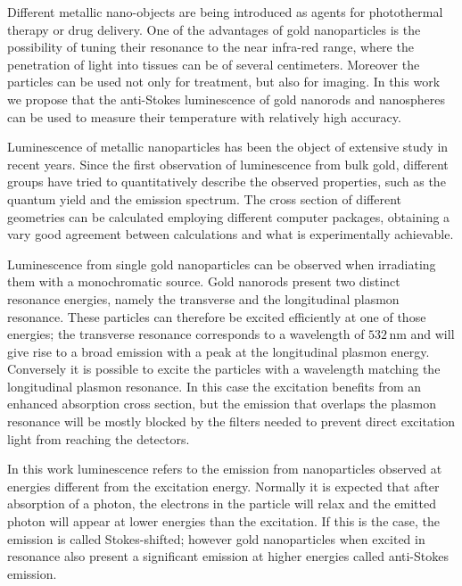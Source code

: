 \documentclass[journal=nalefd,manuscript=letter]{achemso}
\newcommand{\nm}{\ensuremath{\,\textrm{nm}}}
\begin{document}
Different metallic nano-objects are being introduced as agents for photothermal
therapy or drug delivery\cite{Kang2013,Huang2006,Huang2008}. One of the
advantages of gold nanoparticles is the possibility of tuning their resonance to
the near infra-red range, where the penetration of light into tissues can be of
several
centimeters\cite{Huang2006,Gobin2007,Hirsch2003,ONeal2004,Li2013c,Huang2008}.
Moreover the particles can be used not only for treatment, but also for
imaging\cite{Zhao2014a,Huang2006}. In this work we propose that the anti-Stokes
luminescence of gold nanorods and nanospheres can be used to measure their
temperature with relatively high accuracy.

Luminescence of metallic nanoparticles has been the object of extensive study in
recent years. Since the first observation of luminescence from bulk
gold\cite{Mooradian1969}, different groups have tried to quantitatively describe
the observed properties\cite{Mohamed2000,Beversluis2003a}, such as the quantum
yield\cite{Fang2012,Rao2015,Yorulmaz2012,Cheng2015,Dulkeith2004} and the
emission spectrum\cite{Link2010}. The cross section of different geometries can
be calculated employing different computer
packages\cite{Yurkin2011,Draine1994,Oskooi2010}, obtaining a vary good agreement
between calculations and what is experimentally achievable.

Luminescence from single gold nanoparticles can be observed when
irradiating them with a monochromatic source. Gold nanorods present two distinct
resonance energies, namely the transverse and the longitudinal plasmon
resonance. These particles can therefore be excited efficiently at one of those
energies; the transverse resonance corresponds to a wavelength of $532\nm$ and will give
rise to a broad emission with a peak at the longitudinal plasmon energy.
Conversely it is possible to excite the particles with a wavelength matching
the longitudinal plasmon resonance. In this case the excitation benefits from
an enhanced absorption cross section, but the emission that overlaps the plasmon
resonance will be mostly blocked by the filters needed to prevent direct
excitation light from reaching the detectors.

In this work luminescence refers to the emission from nanoparticles observed at
energies different from the excitation energy. Normally it is expected that
after absorption of a photon, the electrons in the particle will relax and the
emitted photon will appear at lower energies than the excitation. If this is the
case, the emission is called Stokes-shifted; however gold nanoparticles when
excited in resonance also present a significant emission at higher energies
called anti-Stokes emission\cite{He2015,Jiang2013,Carattino2016a}.
\end{document}
